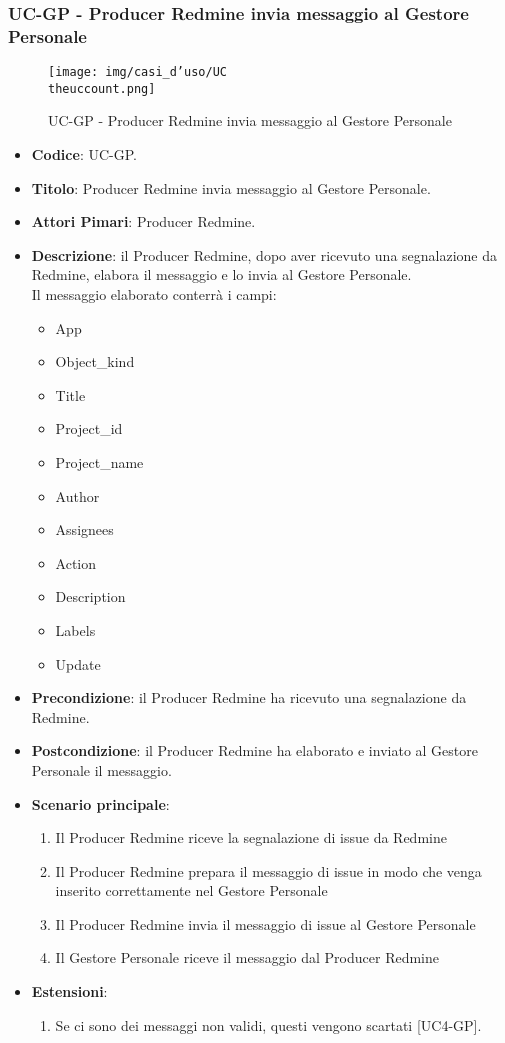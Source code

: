 \subsubsection{UC\theuccount-GP - Producer Redmine invia messaggio al Gestore Personale}
    \begin{figure}[H]
		\centering
		\texttt{[image: img/casi\_d'uso/UC\\theuccount.png]}\\
		\caption{UC\theuccount-GP - Producer Redmine invia messaggio al Gestore Personale}
	\end{figure}
	\begin{itemize}
		\item \textbf{Codice}: UC\theuccount-GP.
		\item \textbf{Titolo}: Producer Redmine invia messaggio al Gestore Personale.
		\item \textbf{Attori Pimari}: Producer Redmine.
		\item \textbf{Descrizione}: il Producer Redmine, dopo aver ricevuto una
		 segnalazione da Redmine, elabora il messaggio e lo invia al Gestore Personale.\\
		 Il messaggio elaborato conterrà i campi:
		 \begin{itemize}
		 	\item App
		 	\item Object\_kind
		 	\item Title
		 	\item Project\_id
		 	\item Project\_name
		 	\item Author
		 	\item Assignees
		 	\item Action
		 	\item Description
		 	\item Labels
		 	\item Update
		 \end{itemize}
		\item \textbf{Precondizione}: il Producer Redmine ha ricevuto una segnalazione da Redmine.
		\item \textbf{Postcondizione}: il Producer Redmine ha elaborato e inviato al Gestore Personale il messaggio.
		\item \textbf{Scenario principale}:
		\begin{enumerate}
			\item Il Producer Redmine riceve la segnalazione di issue da Redmine
			\item Il Producer Redmine prepara il messaggio di issue in modo che venga inserito correttamente nel Gestore Personale
			\item Il Producer Redmine invia il messaggio di issue al Gestore Personale
            \item Il Gestore Personale riceve il messaggio dal Producer Redmine
		\end{enumerate}
        	\item \textbf{Estensioni}:
        \begin{enumerate}
            \item Se ci sono dei messaggi non validi, questi vengono scartati [UC4-GP].
        \end{enumerate}
	\end{itemize}

